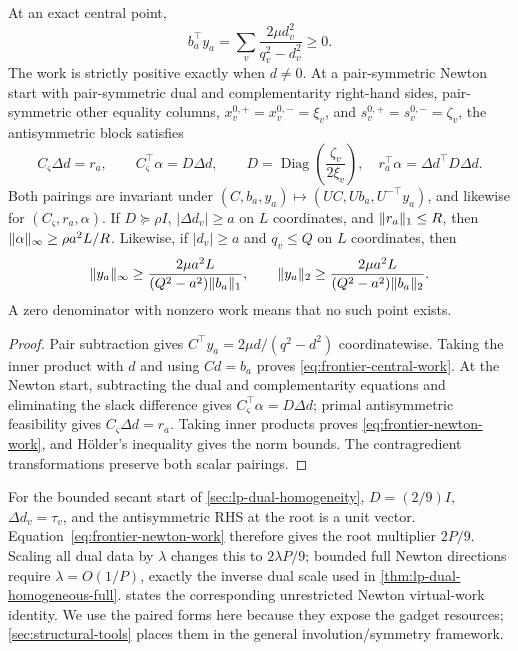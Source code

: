\begin{theorem}
\label{thm:frontier-work}
At an exact central point,
\begin{equation}
 \boxed{b_a^\top y_a
 =\sum_v\frac{2\mu d_v^2}{q_v^2-d_v^2}\geq0.}
 \label{eq:frontier-central-work}
\end{equation}
The work is strictly positive exactly when \(d\ne0\).  At a pair-symmetric
Newton start with pair-symmetric dual and complementarity right-hand sides,
pair-symmetric other equality columns,
\(x_v^{0,+}=x_v^{0,-}=\xi_v\), and
\(s_v^{0,+}=s_v^{0,-}=\zeta_v\), the antisymmetric block satisfies
\begin{equation}
 C_\varsigma\Delta d=r_a,
 \qquad C_\varsigma^\top\alpha=D\Delta d,
 \qquad D=\operatorname{Diag}\!\left(\frac{\zeta_v}{2\xi_v}\right),
 \quad
 \boxed{r_a^\top\alpha=\Delta d^\top D\Delta d.}
 \label{eq:frontier-newton-work}
\end{equation}
Both pairings are invariant under
\((C,b_a,y_a)\mapsto(UC,Ub_a,U^{-\top}y_a)\), and likewise for
\((C_\varsigma,r_a,\alpha)\).  If \(D\succeq\rho I\),
\(|\Delta d_v|\geq a\) on \(L\) coordinates, and \(\lVert r_a\rVert_1\leq R\),
then \(\lVert\alpha\rVert_\infty\geq\rho a^2L/R\).
Likewise, if \(|d_v|\geq a\) and \(q_v\leq Q\) on \(L\) coordinates,
then
\begin{equation}
 \lVert y_a\rVert_\infty\geq
 \frac{2\mu a^2L}{(Q^2-a^2)\lVert b_a\rVert_1},
 \qquad
 \lVert y_a\rVert_2\geq
 \frac{2\mu a^2L}{(Q^2-a^2)\lVert b_a\rVert_2}.
 \label{eq:frontier-central-work-norms}
\end{equation}
A zero denominator with nonzero work means that no such point exists.
\end{theorem}

\begin{proof}
Pair subtraction gives
\(C^\top y_a=2\mu d/(q^2-d^2)\) coordinatewise.  Taking the inner product
with \(d\) and using \(Cd=b_a\) proves
\eqref{eq:frontier-central-work}.  At the Newton start, subtracting the dual
and complementarity equations and eliminating the slack difference gives
\(C_\varsigma^\top\alpha=D\Delta d\); primal antisymmetric feasibility gives
\(C_\varsigma\Delta d=r_a\).  Taking inner products proves
\eqref{eq:frontier-newton-work}, and H\"older's inequality gives the norm
bounds.  The contragredient transformations preserve both scalar pairings.
\end{proof}

For the bounded secant start of \cref{sec:lp-dual-homogeneity},
\(D=(2/9)I\), \(\Delta d_v=\tau_v\), and the antisymmetric RHS at the root
is a unit vector.  Equation~\eqref{eq:frontier-newton-work} therefore gives
the root multiplier \(2P/9\).  Scaling all dual data by \(\lambda\)
changes this to \(2\lambda P/9\); bounded full Newton directions require
\(\lambda=O(1/P)\), exactly the inverse dual scale used in
\cref{thm:lp-dual-homogeneous-full}.  
states the corresponding unrestricted Newton virtual-work identity.  We use
the paired forms here because they expose the gadget resources;
\cref{sec:structural-tools} places them in the general
involution/symmetry framework.

